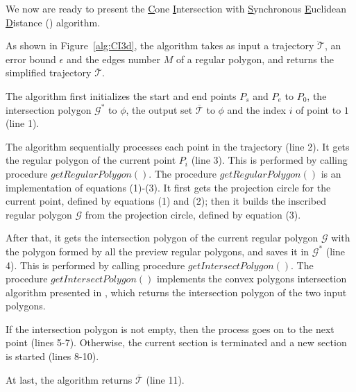 We now are ready to present the \underline{C}one \underline{I}ntersection with \underline{S}ynchronous \underline{E}uclidean \underline{D}istance (\cist) algorithm.

As shown in Figure~\ref{alg:CI3d}, the algorithm takes as input a trajectory $\dddot{\mathcal{T}}$, an error bound $\epsilon$ and the edges number $M$ of a regular polygon, and returns the simplified trajectory $\overline{\mathcal{T}}$.

The algorithm first initializes the start and end points $P_s$ and $P_e$ to $P_0$, the intersection polygon $\mathcal{G}^*$ to $\phi$, the output set $\overline{\mathcal{T}}$ to $\phi$ and the index $i$ of point to $1$ (line 1).

The algorithm sequentially processes each point in the trajectory (line 2).
It gets the regular polygon of the current point $P_i$ (line 3).
This is performed by calling procedure $getRegularPolygon()$. The procedure $getRegularPolygon()$ is an implementation of equations (1)-(3). It first gets the projection circle for the current point, defined by equations (1) and (2); then it builds the inscribed regular polygon $\mathcal{G}$ from the projection circle, defined by equation (3).

After that, it gets the intersection polygon of the current regular polygon $\mathcal{G}$ with the polygon formed by all the preview regular polygons, and saves it in $\mathcal{G}^*$ (line 4).
This is performed by calling procedure $getIntersectPolygon()$. The {procedure $getIntersectPolygon()$} implements the convex polygons intersection algorithm presented in \cite{ORourke:Intersection}, which returns the intersection polygon of the two input polygons.

If the intersection polygon is not empty, then the process goes on to the next point (lines 5-7).
Otherwise, the current section is terminated and a new section is started (lines 8-10).

At last, the algorithm returns $\overline{\mathcal{T}}$ (line 11).





